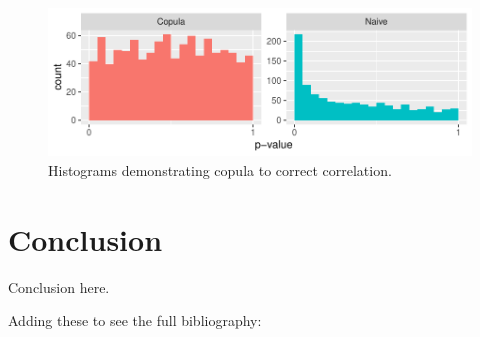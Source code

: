 \documentclass[12pt, letterpaper, titlepage]{article}
\begin{document}
\begin{figure}[tbp]
  \centering
  \includegraphics{hist_copula}
  \caption{Histograms demonstrating copula to correct correlation.}
  \label{fig:hist_copula}
\end{figure}

\hypertarget{sec:conclusion}{%
\section{Conclusion}\label{sec:conclusion}}

Conclusion here.

Adding these to see the full bibliography: 

\citet{Steinskog}
\citet{Weiss}
\citet{Massey}
\citet{Lilliefors}
\citet{Arnold}
\citet{Conover}
\citet{Gleser}
\citet{Babu}
\citet{Butorina}
\citet{Racine}
\citet{Wang}
\citet{Capasso}
\citet{Dimitrova}
\citet{Genest}



\end{document}
